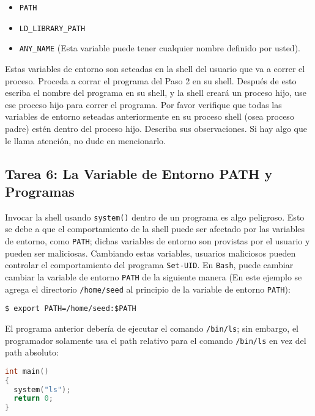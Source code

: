 \begin{itemize}[noitemsep]
\item {\tt PATH}
\item {\tt LD\_LIBRARY\_PATH}
\item {\tt ANY\_NAME} (Esta variable puede tener cualquier nombre definido por usted).
\end{itemize}

Estas variables de entorno son seteadas en la shell del usuario que va a correr el proceso. Proceda a corrar el programa \setuid del Paso 2 en su shell. Después de esto escriba el nombre del programa en su shell, y la shell creará un proceso hijo, use ese proceso hijo para correr el programa. Por favor verifique que todas las variables de entorno seteadas anteriormente en su proceso shell (osea proceso padre) estén dentro del proceso \setuid hijo. Describa sus observaciones. Si hay algo que le llama atención, no dude en mencionarlo.



\subsection{Tarea 6: La Variable de Entorno PATH y Programas \setuid }

Invocar la shell usando {\tt system()} dentro de un programa \setuid es algo peligroso. Esto se debe a que el comportamiento de la shell puede ser afectado por las variables de entorno, como {\tt PATH}; dichas variables de entorno son provistas por el usuario y pueden ser maliciosas. Cambiando estas variables, usuarios maliciosos pueden controlar el comportamiento del programa {\tt Set-UID}.
En {\tt Bash}, puede cambiar cambiar la variable de entorno {\tt PATH} de la siguiente manera (En este ejemplo se agrega el directorio {\tt /home/seed} al principio de la variable de entorno {\tt PATH}):


\begin{lstlisting}
$ export PATH=/home/seed:$PATH
\end{lstlisting}


El programa \setuid anterior debería de ejecutar el comando {\tt /bin/ls}; sin embargo, el programador solamente usa el path relativo para el comando {\tt /bin/ls} en vez del path absoluto:

\begin{lstlisting}[language=C]
int main()
{
  system("ls");
  return 0;
}
\end{lstlisting}

